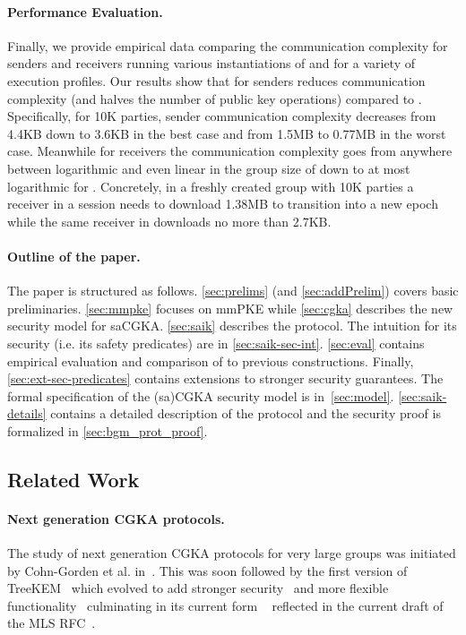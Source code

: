 \paragraph{Performance Evaluation.}
Finally, we provide empirical data comparing the communication complexity for
senders and receivers running various instantiations of \saik and \protITK
for a variety of execution profiles. Our results show that for senders \saik
reduces communication complexity (and halves the number of public key
operations) compared to \protITK. Specifically, for 10K parties, sender
communication complexity decreases from 4.4KB down to 3.6KB in the best case
and from 1.5MB to 0.77MB in the worst case. Meanwhile for receivers the
communication complexity goes from anywhere between logarithmic and even
linear in the group size of \protITK down to at most logarithmic for \saik. Concretely, in a freshly created group with
10K parties a receiver in a \protITK session needs to download 1.38MB to transition into a
new epoch while the same receiver in \saik downloads no more than 2.7KB.

\paragraph{Outline of the paper.}
The paper is structured as follows. \cref{sec:prelims}
(and \cref{sec:addPrelim}) covers basic preliminaries. \cref{sec:mmpke}
focuses on mmPKE while \cref{sec:cgka} describes the new security model for
saCGKA. \cref{sec:saik} describes the \saik protocol.
The intuition for its security (i.e. its safety predicates) are in
\cref{sec:saik-sec-int}. \cref{sec:eval} contains empirical
evaluation and comparison of \saik to previous constructions. Finally, \cref{sec:ext-sec-predicates} contains extensions
to stronger security guarantees.
The formal specification of the (sa)CGKA security
model is in~\cref{sec:model}. \cref{sec:saik-details} contains a detailed description of the \saik protocol and the
security proof is formalized in \cref{sec:bgm_prot_proof}.

\subsection{Related Work}

\paragraph{Next generation CGKA protocols.}
The study of next generation CGKA protocols for very large groups was
initiated by Cohn-Gorden et al. in~\cite{CCS:CCGMM18}. This was soon followed
by the first version of TreeKEM~\cite{TreeKEM-original-email} which
evolved to add stronger
security~\cite{TreeKEM-original-email,TreeKEM-with-blanking-email,TreeKEM-tree-signing-email}
and more flexible functionality~\cite{TreeKEM-prop-and-comm-email}
culminating in its current form \protITK{}~\cite{EPRINT:AlwJosMul20}
reflected in the current draft of the MLS RFC~\cite{mls-protocol-latest}.

